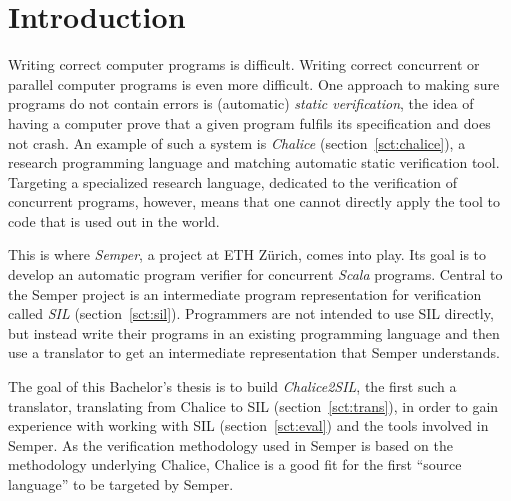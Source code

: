 
\section{Introduction}
Writing correct computer programs is difficult. 
Writing correct concurrent or parallel computer programs is even more difficult. 
One approach to making sure programs do not contain errors is (automatic) \emph{static verification}, the idea of having a computer prove that a given program fulfils its specification and does not crash.
An example of such a system is \emph{Chalice} \cite{LMS09} (section~\ref{sct:chalice}), a research programming language and matching automatic static verification tool.
Targeting a specialized research language, dedicated to the verification of concurrent programs, however, means that one cannot directly apply the tool to code that is used out in the world.

This is where \emph{Semper}, a project at ETH Zürich, comes into play. 
Its goal is to develop an automatic program verifier for concurrent \emph{Scala} \cite{Scala} programs.
Central to the Semper project is an intermediate program representation for verification called \emph{SIL} (section~\ref{sct:sil}).
Programmers are not intended to use SIL directly, but instead write their programs in an existing programming  language and then use a translator to get an intermediate representation that Semper understands.

The goal of this Bachelor's thesis is to build \emph{Chalice2SIL}, the first such a translator, translating from Chalice to SIL (section~\ref{sct:trans}), in order to gain experience with working with SIL (section~\ref{sct:eval}) and the tools involved in Semper.
As the verification methodology used in Semper is based on the methodology underlying Chalice, Chalice is a good fit for the first ``source language'' to be targeted by Semper.